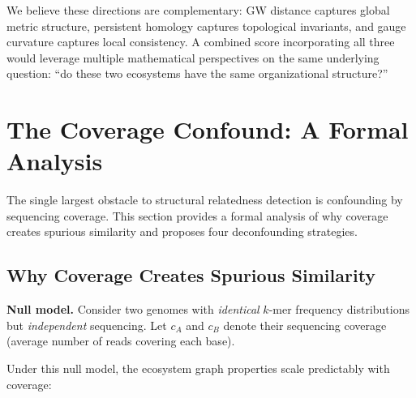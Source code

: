 \documentclass{../yalumba}
\begin{document}
We believe these directions are complementary: GW distance captures
global metric structure, persistent homology captures topological
invariants, and gauge curvature captures local consistency.  A combined
score incorporating all three would leverage multiple mathematical
perspectives on the same underlying question: ``do these two ecosystems
have the same organizational structure?''


\section{The Coverage Confound: A Formal Analysis}
\label{sec:coverage}

The single largest obstacle to structural relatedness detection is
confounding by sequencing coverage.  This section provides a formal
analysis of why coverage creates spurious similarity and proposes
four deconfounding strategies.

\subsection{Why Coverage Creates Spurious Similarity}
\label{sec:coverage:why}

\begin{definition}
\textbf{Null model.}  Consider two genomes with \emph{identical}
$k$-mer frequency distributions but \emph{independent} sequencing.
Let $c_A$ and $c_B$ denote their sequencing coverage (average number
of reads covering each base).
\end{definition}

Under this null model, the ecosystem graph properties scale
predictably with coverage:
\end{document}
